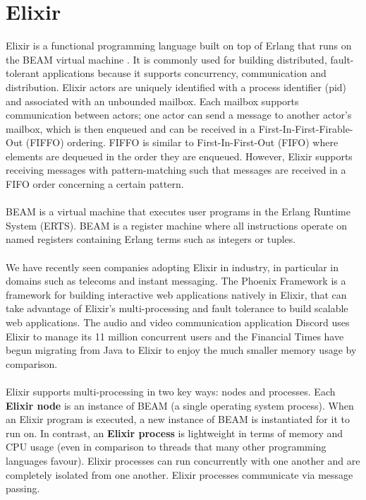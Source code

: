 \section{Elixir}
Elixir \cite{elixir} is a functional programming language built on top of Erlang \cite{erlang} that runs on the BEAM virtual machine \cite{beam}. It is commonly used for building distributed, fault-tolerant applications because it supports concurrency, communication and distribution. Elixir actors are uniquely identified with a process identifier (pid) and associated with an unbounded mailbox. Each mailbox supports communication between actors; one actor can send a message to another actor's mailbox, which is then enqueued and can be received in a First-In-First-Firable-Out (FIFFO) ordering. FIFFO is similar to First-In-First-Out (FIFO) where elements are dequeued in the order they are enqueued. However, Elixir supports receiving messages with pattern-matching such that messages are received in a FIFO order concerning a certain pattern.
\\ \\
BEAM is a virtual machine that executes user programs in the Erlang Runtime System (ERTS). BEAM is a register machine where all instructions operate on named registers containing Erlang terms such as integers or tuples.
\\ \\
We have recently seen companies adopting Elixir in industry, in particular in domains such as telecoms and instant messaging. The Phoenix Framework \cite{phoenix} is a framework for building interactive web applications natively in Elixir, that can take advantage of Elixir's multi-processing and fault tolerance to build scalable web applications. The audio and video communication application Discord \cite{discord} uses Elixir to manage its 11 million concurrent users and the Financial Times \cite{ft} have begun migrating from Java to Elixir to enjoy the much smaller memory usage by comparison.
\\ \\
Elixir supports multi-processing in two key ways: nodes and processes. Each \textbf{Elixir node} is an instance of BEAM (a single operating system process). When an Elixir program is executed, a new instance of BEAM is instantiated for it to run on. In contrast, an \textbf{Elixir process} is lightweight in terms of memory and CPU usage (even in comparison to threads that many other programming languages favour). Elixir processes can run concurrently with one another and are completely isolated from one another. Elixir processes communicate via message passing.
